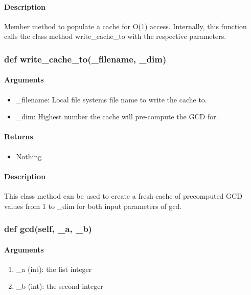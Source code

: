 \documentclass[refman]{scrartcl}
\begin{document}
\paragraph*{Description}

Member method to populate a cache for O(1) access.
Internally, this function calls the class method write\_cache\_to
with the respective parameters.

\subsubsection{def write\_cache\_to(\_filename, \_dim)}

\paragraph*{Arguments}

\begin{itemize}
	\item \_filename: Local file systems file name to write the cache to.
	\item \_dim: Highest number the cache will pre-compute the GCD for.
\end{itemize}

\paragraph*{Returns}

\begin{itemize}
	\item Nothing
\end{itemize}

\paragraph*{Description}

This class method can be used to create a fresh cache of precomputed GCD values from 1 to \_dim for both input parameters of gcd.

\subsubsection{def gcd(self, \_a, \_b)}

\paragraph*{Arguments}

\begin{enumerate}
	\item \_a (int): the fist integer
	\item \_b (int): the second integer
\end{enumerate}
\end{document}
